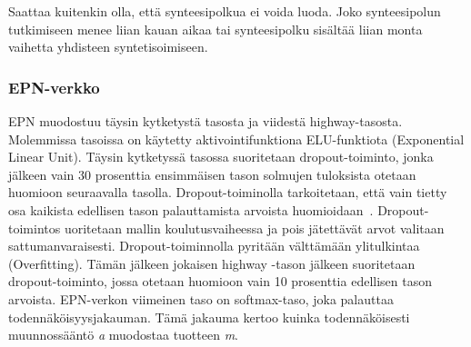 \documentclass[finnish,twoside,censored,tkt,sw-line]{HYthesisML}
\begin{document}
Saattaa kuitenkin olla, että synteesipolkua ei voida luoda.
Joko synteesipolun tutkimiseen menee liian kauan aikaa tai synteesipolku sisältää liian monta vaihetta yhdisteen syntetisoimiseen.


\subsubsection{EPN-verkko}

EPN muodostuu täysin kytketystä tasosta ja viidestä highway-tasosta.
Molemmissa tasoissa on käytetty aktivointifunktiona ELU-funktiota (Exponential Linear Unit).
Täysin kytketyssä tasossa suoritetaan dropout-toiminto, jonka jälkeen vain 30 prosenttia ensimmäisen tason solmujen tuloksista otetaan huomioon seuraavalla tasolla.
Dropout-toiminolla tarkoitetaan, että vain tietty osa kaikista edellisen tason palauttamista arvoista huomioidaan~\cite{hinton2012improving}.
Dropout-toimintos uoritetaan mallin koulutusvaiheessa ja pois jätettävät arvot valitaan sattumanvaraisesti.
Dropout-toiminnolla pyritään välttämään ylitulkintaa (Overfitting).
Tämän jälkeen jokaisen highway -tason jälkeen suoritetaan dropout-toiminto, jossa otetaan huomioon vain 10 prosenttia edellisen tason arvoista.
EPN-verkon viimeinen taso on softmax-taso, joka palauttaa todennäköisyysjakauman.
Tämä jakauma kertoo kuinka todennäköisesti muunnossääntö \emph{a} muodostaa tuotteen \emph{m}.
\end{document}
